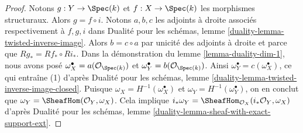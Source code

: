 \begin{proof}
Notons $g : Y \to \Spec(k)$ et $f : X \to \Spec(k)$ les morphismes structuraux. Alors $g = f \circ i$. Notons $a, b, c$ les adjoints à droite associés respectivement à $f, g, i$ dans Dualité pour les schémas, lemme \ref{duality-lemma-twisted-inverse-image}. Alors $b = c \circ a$ par unicité des adjoints à droite et parce que $Rg_* = Rf_* \circ Ri_*$. Dans la démonstration du lemme \ref{lemma-duality-dim-1}, nous avons posé $\omega_X^\bullet = a(\mathcal{O}_{\Spec(k)})$ et $\omega_Y^\bullet = b(\mathcal{O}_{\Spec(k)})$. Ainsi $\omega_Y^\bullet = c(\omega_X^\bullet)$, ce qui entraîne (1) d'après Dualité pour les schémas, lemme \ref{duality-lemma-twisted-inverse-image-closed}. Puisque $\omega_X = H^{-1}(\omega_X^\bullet)$ et $\omega_Y = H^{-1}(\omega_Y^\bullet)$, on en conclut que $\omega_Y = \SheafHom(\mathcal{O}_Y, \omega_X)$. Cela implique $i_*\omega_Y = \SheafHom_{\mathcal{O}_X}(i_*\mathcal{O}_Y, \omega_X)$ d'après Dualité pour les schémas, lemme \ref{duality-lemma-sheaf-with-exact-support-ext}.
\end{proof}

